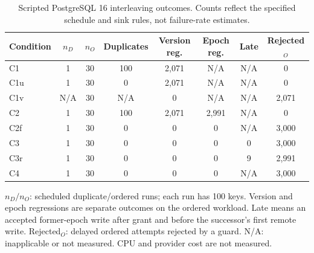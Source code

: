 \begin{table}[!t]\caption{Scripted PostgreSQL 16 interleaving outcomes. Counts reflect the specified schedule and sink rules, not failure-rate estimates.}\label{tab:results}
\centering\footnotesize\setlength{\tabcolsep}{6pt}
\begin{tabular}{lccccccc}\toprule
Condition & $n_D$ & $n_O$ & Duplicates & Version reg. & Epoch reg. & Late & Rejected$_O$\\\midrule
C1 & 1 & 30 & 100 & 2,071 & N/A & N/A & 0\\
C1u & 1 & 30 & 0 & 2,071 & N/A & N/A & 0\\
C1v & N/A & 30 & N/A & 0 & N/A & N/A & 2,071\\
C2 & 1 & 30 & 100 & 2,071 & 2,991 & N/A & 0\\
C2f & 1 & 30 & 0 & 0 & 0 & N/A & 3,000\\
C3 & 1 & 30 & 0 & 0 & 0 & 0 & 3,000\\
C3r & 1 & 30 & 0 & 0 & 0 & 9 & 2,991\\
C4 & 1 & 30 & 0 & 0 & 0 & N/A & 3,000\\\bottomrule
\end{tabular}
\par\vspace{4pt}\parbox{.95\textwidth}{\scriptsize $n_D/n_O$: scheduled duplicate/ordered runs; each run has 100 keys. Version and epoch regressions are separate outcomes on the ordered workload. Late means an accepted former-epoch write after grant and before the successor's first remote write. Rejected$_O$: delayed ordered attempts rejected by a guard. N/A: inapplicable or not measured. CPU and provider cost are not measured.}
\end{table}
